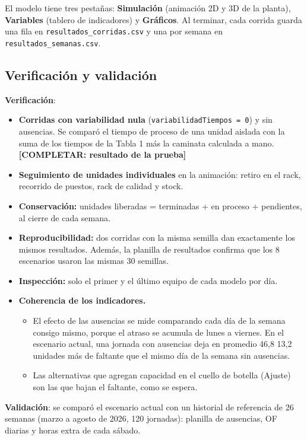 \documentclass[11pt,a4paper]{article}
\newcommand{\pendiente}[1]{\textbf{[#1]}}
\begin{document}
El modelo tiene tres pestañas: \textbf{Simulación} (animación 2D y 3D de la planta), \textbf{Variables} (tablero de indicadores) y \textbf{Gráficos}. Al terminar, cada corrida guarda una fila en \texttt{resultados\_\allowbreak{}corridas.csv} y una por semana en \texttt{resultados\_\allowbreak{}semanas.csv}.

\subsection{Verificación y validación}

\textbf{Verificación}:

\begin{itemize}
\item \textbf{Corridas con variabilidad nula} (\texttt{variabilidadTiempos = 0}) y sin ausencias. Se comparó el tiempo de proceso de una unidad aislada con la suma de los tiempos de la Tabla 1 más la caminata calculada a mano. \pendiente{COMPLETAR: resultado de la prueba}
\item \textbf{Seguimiento de unidades individuales} en la animación: retiro en el rack, recorrido de puestos, rack de calidad y stock.
\item \textbf{Conservación:} unidades liberadas = terminadas + en proceso + pendientes, al cierre de cada semana.
\item \textbf{Reproducibilidad:} dos corridas con la misma semilla dan exactamente los mismos resultados. Además, la planilla de resultados confirma que los 8 escenarios usaron las mismas 30 semillas.
\item \textbf{Inspección:} solo el primer y el último equipo de cada modelo por día.
\item \textbf{Coherencia de los indicadores.}
\begin{itemize}
\item El efecto de las ausencias se mide comparando cada día de la semana consigo mismo, porque el atraso se acumula de lunes a viernes. En el escenario actual, una jornada con ausencias deja en promedio 46,8 \textpm{} 13,2 unidades más de faltante que el mismo día de la semana sin ausencias.
\item Las alternativas que agregan capacidad en el cuello de botella (Ajuste) son las que bajan el faltante, como se espera.
\end{itemize}
\end{itemize}

\textbf{Validación}: se comparó el escenario actual con un historial de referencia de 26 semanas (marzo a agosto de 2026, 120 jornadas): planilla de ausencias, OF diarias y horas extra de cada sábado.
\end{document}
